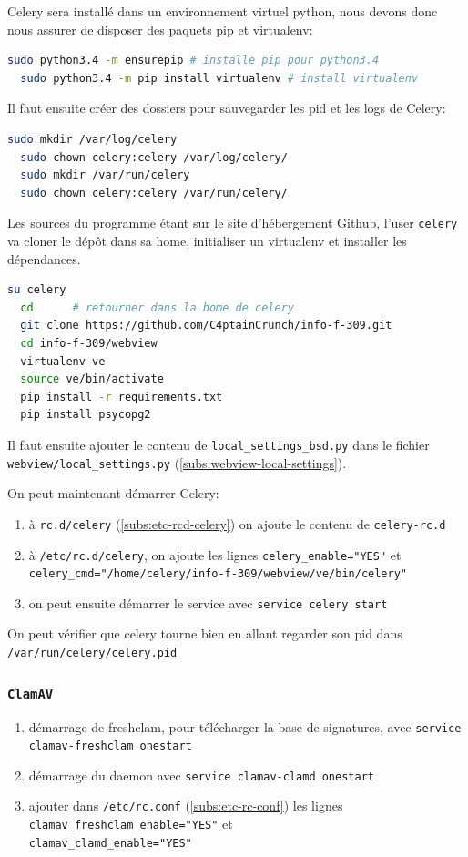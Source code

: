 \documentclass[10pt,a4paper]{article}
\begin{document}
Celery sera installé dans un environnement virtuel python, nous devons donc nous assurer de disposer des paquets pip et virtualenv:
\begin{lstlisting}[language=bash]
  sudo python3.4 -m ensurepip # installe pip pour python3.4
  sudo python3.4 -m pip install virtualenv # install virtualenv
\end{lstlisting}

Il faut ensuite créer des dossiers pour sauvegarder les pid et les logs de Celery:
\begin{lstlisting}[language=bash]
  sudo mkdir /var/log/celery
  sudo chown celery:celery /var/log/celery/
  sudo mkdir /var/run/celery
  sudo chown celery:celery /var/run/celery/
\end{lstlisting}

Les sources du programme étant sur le site d'hébergement Github, l'user \texttt{celery} va cloner le dépôt dans sa home, initialiser un virtualenv et installer les dépendances.
\begin{lstlisting}[language=bash]
  su celery
  cd      # retourner dans la home de celery
  git clone https://github.com/C4ptainCrunch/info-f-309.git
  cd info-f-309/webview
  virtualenv ve
  source ve/bin/activate
  pip install -r requirements.txt
  pip install psycopg2
\end{lstlisting}

Il faut ensuite ajouter le contenu de \texttt{local\_settings\_bsd.py} dans le fichier \texttt{webview/local\_settings.py} (\ref{subs:webview-local-settings}).

On peut maintenant démarrer Celery:
\begin{enumerate}
  \item à \texttt{rc.d/celery} (\ref{subs:etc-rcd-celery}) on ajoute le contenu de \texttt{celery-rc.d}
  \item à \texttt{/etc/rc.d/celery}, on ajoute les lignes \texttt{celery\_enable="YES"} et\\ \texttt{celery\_cmd="/home/celery/info-f-309/webview/ve/bin/celery"}
  \item on peut ensuite démarrer le service avec \texttt{service celery start}
\end{enumerate}

On peut vérifier que celery tourne bien en allant regarder son pid dans \texttt{/var/run/celery/celery.pid}

\subsubsection{\texttt{ClamAV}}
\begin{enumerate}
  \item démarrage de freshclam, pour télécharger la base de signatures, avec \texttt{service clamav-freshclam onestart}
  \item démarrage du daemon avec \texttt{service clamav-clamd onestart}
  \item ajouter dans \texttt{/etc/rc.conf} (\ref{subs:etc-rc-conf}) les lignes \texttt{clamav\_freshclam\_enable="YES"} et\\ \texttt{clamav\_clamd\_enable="YES"}
\end{enumerate}
\end{document}
